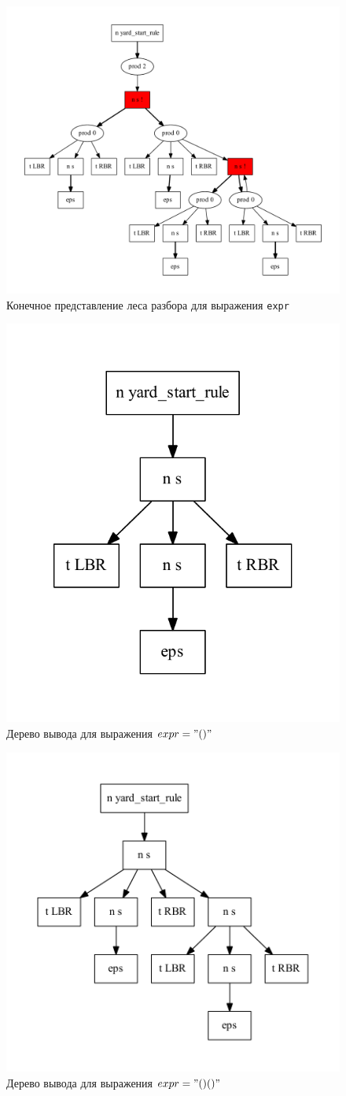 \begin{figure}[!h]
 \centering
 \includegraphics[width=15cm]{pics/sppf.pdf}
 \caption{Конечное представление леса разбора для выражения \texttt{expr}}
 \label{sppf}
\end{figure}

\begin{figure}[!h]
 \centering
 \includegraphics[width=.4\textwidth]{pics/sppf1.pdf}
 \caption{Дерево вывода для выражения $expr="()"$}
 \label{sppf1}
\end{figure}

\begin{figure}[!h]
 \centering
 \includegraphics[width=.5\textwidth]{pics/sppf2.pdf}
 \caption{Дерево вывода для выражения $expr="()()"$}
 \label{sppf2}
\end{figure}

